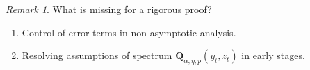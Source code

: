 \documentclass{article}
\theoremstyle{plain}
\theoremstyle{remark}
\newtheorem*{remark}{Remark}
\newcommand{\norm}[1]{\left\lVert#1\right\rVert}
\newcommand{\cc}[1]{\text{\ding{\number\numexpr#1 + 171\relax}}}
\newcommand{\cbb}[1]{\noindent{\color{blue}{#1}}}  %
\newcommand{\crr}[1]{\noindent{\color{red}{#1}}}  %
\begin{document}
    


    

\begin{remark}
    What is missing for a rigorous proof?
    \begin{enumerate}
        \item Control of error terms in non-asymptotic analysis.
        \item Resolving assumptions of spectrum $\mathbf{Q}_{\alpha,\eta,p}(y_t, z_t)$ in early stages.
    \end{enumerate}
\end{remark}
\end{document}
